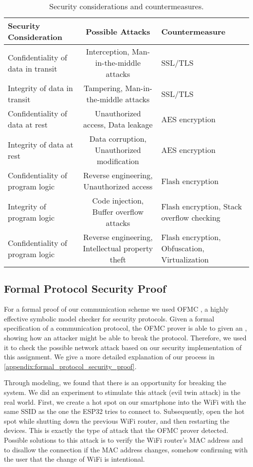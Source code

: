 \documentclass[conference]{IEEEtran}
\begin{document}
\begin{table}[h]
\centering
\begin{adjustbox}{width=\columnwidth,center}
\begin{tabular}{|l|c||l|}
\hline
\textbf{Security Consideration} & \textbf{Possible Attacks} & \textbf{Countermeasure} \\ \hline
Confidentiality of data in transit & Interception, Man-in-the-middle attacks          & SSL/TLS \\ \hline
Integrity of data in transit       & Tampering, Man-in-the-middle attacks             & SSL/TLS \\ \hline
Confidentiality of data at rest    & Unauthorized access, Data leakage                & AES encryption \\ \hline
Integrity of data at rest          & Data corruption, Unauthorized modification       & AES encryption \\ \hline
Confidentiality of program logic   & Reverse engineering, Unauthorized access         & Flash encryption \\ \hline
Integrity of program logic         & Code injection, Buffer overflow attacks          & Flash encryption, Stack overflow checking \\ \hline
Confidentiality of program logic   & Reverse engineering, Intellectual property theft & Flash encryption, Obfuscation, Virtualization \\ \hline
\end{tabular}
\end{adjustbox}
\caption{Security considerations and countermeasures.}
\label{tab:security_considerations}
\end{table}

\subsection{Formal Protocol Security Proof}
For a formal proof of our communication scheme we used
OFMC \cite{basin2005ofmc}, a highly effective symbolic model checker for security protocols.
Given a formal specification of a communication protocol, the OFMC prover is able to given an , showing how an attacker might be able to break the protocol.
Therefore, we used it to check the possible network attack based on our security implementation of this assignment.
We give a more detailed explanation of our process in \cref{appendix:formal_protocol_security_proof}.

Through modeling, we found that there is an opportunity for breaking the system.
We did an experiment to stimulate this attack (evil twin attack) in the real world.
First, we create a hot spot on our smartphone into the WiFi with the same SSID as the one the ESP32 tries to connect to.
Subsequently, open the hot spot while shutting down the previous WiFi router, and then restarting the devices.
This is exactly the type of attack that the OFMC prover detected.
Possible solutions to this attack is to verify the WiFi router's MAC address 
and to disallow the connection if the MAC address changes, somehow confirming with the user that the change of WiFi is intentional.
     
\end{document}
